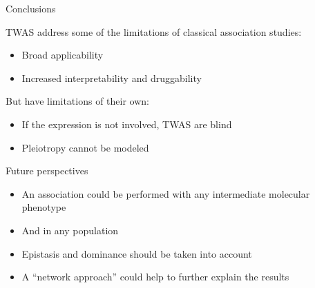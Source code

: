 \documentclass[aspectratio=169,12pt]{beamer}
\begin{document}
\begin{frame}{Conclusions}

	TWAS address some of the limitations of classical association 
studies:

	\begin{itemize}
		\item Broad applicability
		\item Increased interpretability and druggability
	\end{itemize}

	But have limitations of their own:

	\begin{itemize}
		\item If the expression is not involved, TWAS are blind
		\item Pleiotropy cannot be modeled
	\end{itemize}

\end{frame}

\begin{frame}{Future perspectives}

	\begin{itemize}
		\item<1-> An association could be performed with any 
intermediate molecular phenotype
		\item<2-> And in any population
		\item<3-> Epistasis and dominance should be taken into account
		\item<4-> A \enquote{network approach} could help to further 
explain the results
	\end{itemize}


\end{frame}

\appendix

\begin{frame}[plain]
	\nocite{*}
	\tiny
	\printbibliography[title=References,keyword=TWAS]
\end{frame}
\end{document}
